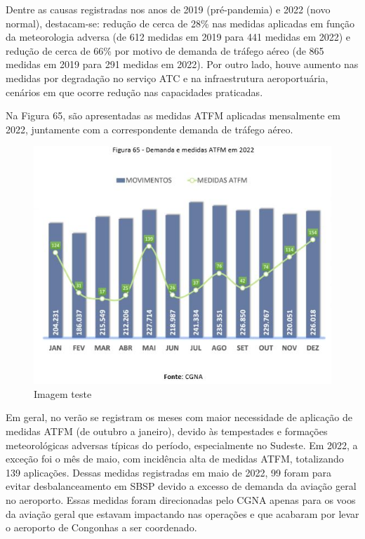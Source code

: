 \documentclass[
]{book}
\begin{document}
Dentre as causas registradas nos anos de 2019 (pré-pandemia) e 2022 (novo normal), destacam-se: redução de cerca de 28\% nas medidas aplicadas em função da meteorologia adversa (de 612 medidas em 2019 para 441 medidas em 2022) e redução de cerca de 66\% por motivo de demanda de tráfego aéreo (de 865 medidas em 2019 para 291 medidas em 2022). Por outro lado, houve aumento nas medidas por degradação no serviço ATC e na infraestrutura aeroportuária, cenários em que ocorre redução nas capacidades praticadas.

Na Figura 65, são apresentadas as medidas ATFM aplicadas mensalmente em 2022, juntamente com a correspondente demanda de tráfego aéreo.

\begin{figure}
\centering
\includegraphics{imagens/fig54.jpg}
\caption{Imagem teste}
\end{figure}

Em geral, no verão se registram os meses com maior necessidade de aplicação de medidas ATFM (de outubro a janeiro), devido às tempestades e formações meteorológicas adversas típicas do período, especialmente no Sudeste. Em 2022, a exceção foi o mês de maio, com incidência alta de medidas ATFM, totalizando 139 aplicações. Dessas medidas registradas em maio de 2022, 99 foram para evitar desbalanceamento em SBSP devido a excesso de demanda da aviação geral no aeroporto. Essas medidas foram direcionadas pelo CGNA apenas para os voos da aviação geral que estavam impactando nas operações e que acabaram por levar o aeroporto de Congonhas a ser coordenado.
\end{document}
